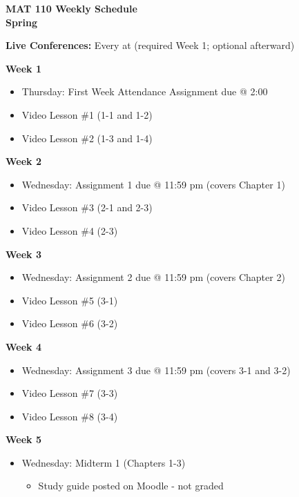 \documentclass[12pt]{letter}
\author{Jacob Ayers}
\newcommand{\red}[1]{{\color{red}{#1}}} %
\newcommand{\?}{\stackrel{?}{=}}
\begin{document}
	
	\begin{center}
		\textbf{MAT 110 Weekly Schedule \\ Spring \red{Year}}
	\end{center}
	\textbf{Live Conferences:} Every \red{day} at \red{time} (required Week 1; optional afterward)
	
	\textbf{Week 1} \begin{itemize} \vspace{-12pt}
		\item Thursday: First Week Attendance Assignment due @ 2:00
		\item Video Lesson \#1 (1-1 and 1-2)
		\item Video Lesson \#2 (1-3 and 1-4)
	\end{itemize}

	\textbf{Week 2} \begin{itemize} \vspace{-12pt}
		\item Wednesday: Assignment 1 due @ 11:59 pm (covers Chapter 1)
		\item Video Lesson \#3 (2-1 and 2-3)
		\item Video Lesson \#4 (2-3)
	\end{itemize}

	\textbf{Week 3} \begin{itemize} \vspace{-12pt}
		\item Wednesday: Assignment 2 due @ 11:59 pm (covers Chapter 2)
		\item Video Lesson \#5 (3-1)
		\item Video Lesson \#6 (3-2)
	\end{itemize}

	\textbf{Week 4} \begin{itemize} \vspace{-12pt}
		\item Wednesday: Assignment 3 due @ 11:59 pm (covers 3-1 and 3-2)
		\item Video Lesson \#7 (3-3)
		\item Video Lesson \#8 (3-4)
	\end{itemize}

	\textbf{Week 5} \begin{itemize} \vspace{-12pt}
		\item Wednesday: Midterm 1 (Chapters 1-3) \begin{itemize}
			\item Study guide posted on Moodle - not graded
		\end{itemize}
	\end{itemize}
\end{document}
